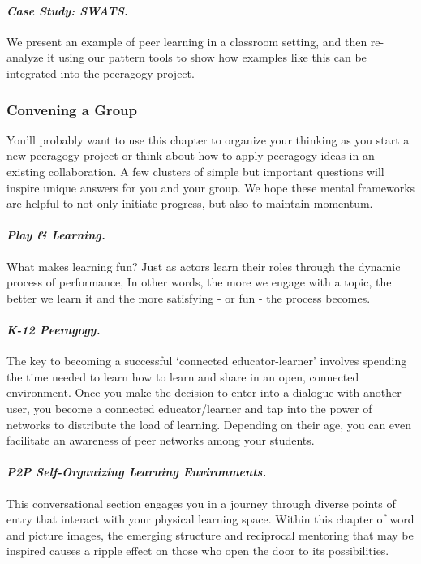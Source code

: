 \paragraph{\emph{Case Study: SWATS.}}
We present an example of peer learning
in a classroom setting, and then re-analyze
it using our pattern tools to show how examples like this can be integrated into
the peeragogy project.

\subsubsection{Convening a Group}

\noindent You'll probably want to use this chapter to organize your thinking as
you start a new peeragogy project or think about how to apply peeragogy
ideas in an existing collaboration. A few clusters of simple but
important questions will inspire unique answers for you and your group.
We hope these mental frameworks are helpful to not only initiate
progress, but also to maintain momentum.

 \paragraph{\emph{Play \& Learning.}} What
makes learning fun? Just as actors learn their roles through the dynamic
process of performance, In other words, the more we engage with a topic,
the better we learn it and the more satisfying - or fun - the process
becomes.

\paragraph{\emph{K-12 Peeragogy.}} The key to becoming a successful
`connected educator-learner' involves spending the time needed to learn
how to learn and share in an open, connected environment. Once you make
the decision to enter into a dialogue with another user, you become a
connected educator/learner and tap into the power of networks to
distribute the load of learning. Depending on their age, you can even
facilitate an awareness of peer networks among your students.

\paragraph{\emph{P2P Self-Organizing Learning Environments.}} This conversational
section engages you in a journey through diverse points of entry that
interact with your physical learning space. Within this chapter of word
and picture images, the emerging structure and reciprocal mentoring that
may be inspired causes a ripple effect on those who open the door to its
possibilities.

